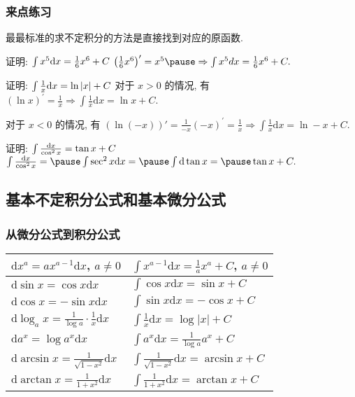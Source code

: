 \documentclass[
10pt,
aspectratio=43,
]{beamer}
\begin{document}
\begin{frame}
	\frametitle{来点练习}
	\everymath{\displaystyle}
	最最标准的求不定积分的方法是直接找到对应的原函数.
	{\small
	\begin{exampleblock}{证明: $\color{black}\int x^5 \mathrm{d} x=\frac{1}{6} x^6+C$}
		\pause
		$
			\left(\frac{1}{6} x^6\right)^{\prime}=x^5 \pause \Rightarrow \int x^5 d x=\frac{1}{6} x^6+C.
		$
	\end{exampleblock}
	\pause
	\begin{exampleblock}{证明: $\color{black}\int \frac1x \mathrm{d} x=\ln |x|+C$}
		\pause
		对于 $x>0$ 的情况, 有
		$
			(\ln x)^{\prime}=\frac{1}{x} \Rightarrow \int \frac{1}{x} \mathrm{d} x=\ln x+C.
		$
		\pause

		对于 $x<0$ 的情况, 有
		$
			(\ln (-x))'=\frac{1}{-x}(-x)^{\prime}=\frac{1}{x} \Rightarrow \int \frac{1}{x} \mathrm{d} x=\ln -x+C.
		$
	\end{exampleblock}

	\begin{exampleblock}{证明: $\color{black}\int \frac{\mathrm{d} x}{\cos ^2 x}=\tan x+C$}
		\pause
		$
			\int \frac{\mathrm{d} x}{\cos ^2 x}=\pause\int \sec ^2 x \mathrm{d} x=\pause\int \mathrm{d} \tan x=\pause\tan x+ C.
		$
	\end{exampleblock}
	}
\end{frame}

\subsection{基本不定积分公式和基本微分公式}
\begin{frame}
	\frametitle{从微分公式到积分公式}
	\everymath{\displaystyle}
	\renewcommand{\arraystretch}{2.3}
	\resizebox{\linewidth}{!}
	{
		\begin{tabular}{|p{}|p{}|}
			\hline
			$\mathrm{d}x^a=ax^{a-1}\mathrm{d}x$, $a\neq0$                   & $\int x^{a-1}\mathrm{d}x=\frac{1}{a}x^{a}+C$, $a\neq0$  \\
			\hline
			$\mathrm{d}\sin x=\cos x\mathrm{d}x$                            & $\int \cos x\mathrm{d}x = \sin x+C$                     \\
			\hline
			$\mathrm{d}\cos x=-\sin x\mathrm{d}x$                           & $\int \sin x\mathrm{d}x=-\cos x +C$                     \\
			\hline
			$\mathrm{d}\log_ax=\frac{1}{\log a}\cdot\frac{1}{x}\mathrm{d}x$ & $\int \frac{1}{x}\mathrm{d}x = \log |x|+C$              \\
			\hline
			$\mathrm{d}a^x=\log a^x\mathrm{d}x$                             & $\int a^x\mathrm{d}x = \frac{1}{\log a}a^x+C$           \\
			\hline
			$\mathrm{d}\arcsin x =\frac{1}{\sqrt{1-x^2}}\mathrm{d}x$        & $\int \frac{1}{\sqrt{1-x^2}}\mathrm{d}x = \arcsin x +C$ \\
			\hline
			$\mathrm{d}\arctan x =\frac{1}{1+x^2}\mathrm{d}x$               & $\int \frac{1}{1+x^2}\mathrm{d}x = \arctan x +C$        \\
			\hline
		\end{tabular}
	}
\end{frame}
\end{document}
